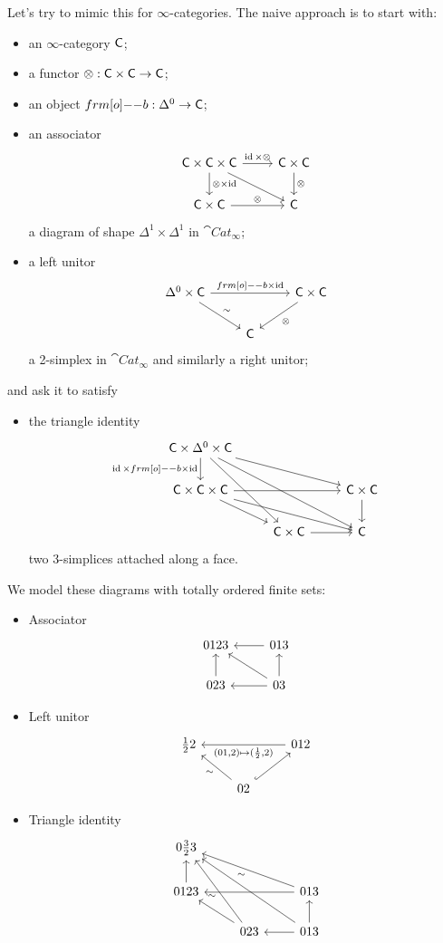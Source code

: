 Let's try to mimic this for $\infty$-categories. The naive approach is to start with:
\begin{itemize}
	\item an $\infty$-category $\mathsf{C}$;
	\item a functor $\otimes:\C\times \C\to \C$;
	\item an object $\1b:\Delta^{0}\to \C$;
	\item an associator
		\[
		\begin{tikzcd}
			\C\times \C\times \C \ar[r,"\id\times \otimes"] \ar[d,"\otimes\times \id"] \ar[dr] & \C \times \C \ar[d,"\otimes"] \\
			\C\times \C \ar[r,"\otimes"] & \C
		\end{tikzcd}
		\] 
		a diagram of shape $\Delta^{1}\times \Delta^{1}$ in $\cat{Cat}_\infty$;
	\item a left unitor
		\[
		\begin{tikzcd}
			\Delta^{0}\times \C \ar[rr,"\1b\times \id"] \ar[dr,"\sim"] & & \C\times \C \ar[dl,"\otimes"] \\
										   & \C
		\end{tikzcd}
		\] 
		a 2-simplex in $\cat{Cat}_\infty$ and similarly a right unitor;
\end{itemize}
and ask it to satisfy
\begin{itemize}
	\item the triangle identity
		\[
		\begin{tikzcd}
			\C\times \Delta^{0}\times \C \ar[d,"\id\times \1b\times \id"'] \ar[ddr] \ar[ddrr] \ar[drr] \\
			\C\times \C\times \C \ar[dr] \ar[rr] \ar[drr] & & \C\times \C \ar[d] \\
								      & \C\times \C \ar[r] & \C
		\end{tikzcd}
		\] 
		two 3-simplices attached along a face.
\end{itemize}
We model these diagrams with totally ordered finite sets:
\begin{itemize}
	\item Associator
		\[
		\begin{tikzcd}
			0123 & 013 \ar[l] \\
			023 \ar[u] & 03 \ar[l] \ar[u] \ar[lu]
		\end{tikzcd}
		\] 
	\item Left unitor
		\[
		\begin{tikzcd}
			\frac{1}{2}2 & & 012 \ar[ll, "{(01, 2)\mapsto (\frac{1}{2}, 2)}"] \\
				     & 02 \ar[lu, "\sim"] \ar[ur,hook]
		\end{tikzcd}
		\] 
	\item Triangle identity
		\[
		\begin{tikzcd}
			0 \frac{3}{2}3 \\
			0123 \ar[u] & & 013 \ar[ull,"\sim"] \ar[ll] \\
				    & 023 \ar[ul] \ar[uul,"\sim"] & 013 \ar[l] \ar[u] \ar[uull]
		\end{tikzcd}
		\] 
\end{itemize}
